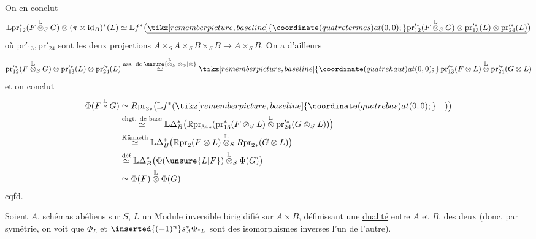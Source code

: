 On en conclut
\[
\mathbb{L} \mathrm{pr}_{12}^*(F\overset{\mathbb L}{\otimes}_S G)\otimes(\pi\times \mathrm{id}_B)^*(L)\simeq \mathbb{L} f^*\bigl(\underline{\tikz[remember picture,baseline]{\coordinate (quatretermes) at (0,0);}\mathrm{pr}_{12}^{\prime *}(F\overset{\mathbb L}{\otimes}_S G)\otimes \mathrm{pr}_{13}^{\prime *}(L)\otimes \mathrm{pr}_{24}^{\prime *}(L)}\bigr)
\]
où $\mathrm{pr}'_{13},\mathrm{pr}'_{24}$ sont les deux projections $A\times_S A\times_S B\times_S B\longrightarrow A\times_S B$. On a d'ailleurs
\[
\mathrm{pr}_{12}^{\prime *}(F\overset{\mathbb L}{\otimes}_S G)\otimes \mathrm{pr}_{13}^{\prime *}(L)\otimes \mathrm{pr}_{24}^{\prime *}(L)
\overset{\text{ass. de }\unsure{\overset{\mathbb L}{\otimes}_S|\otimes_S|\otimes}}{\simeq}
\tikz[remember picture,baseline]{\coordinate (quatrehaut) at (0,0);}\,\mathrm{pr}_{13}^{\prime *}(F\otimes L)\overset{\mathbb L}{\otimes} \mathrm{pr}_{24}^{\prime *}(G\otimes L)
\]
 et on conclut
\[
\begin{aligned}
\Phi(F\overset{\mathbb L}{*} G)&\simeq R \mathrm{pr}_{3*}\bigl(\mathbb{L} f^*(\tikz[remember picture,baseline]{\coordinate (quatrebas) at (0,0);}\hspace{1em})\bigr)\\
&\overset{\text{chgt. de base}}{\simeq}\mathbb{L}\Delta_B^*\bigl(\mathbb{R} \mathrm{pr}_{34*}(\mathrm{pr}_{13}^*(F\otimes_S L)\overset{\mathbb L}{\otimes} \mathrm{pr}_{24}^{\prime *}(G\otimes_S L))\bigr)\\
&\overset{\text{Künneth}}{\simeq}\mathbb{L}\Delta_B^*\bigl(\mathbb{R} \mathrm{pr}_2(F\otimes L)\overset{\mathbb L}{\otimes}_S R \mathrm{pr}_{2*}(G\otimes L)\bigr)\\
&\overset{\text{déf}}{\simeq}\mathbb{L}\Delta_B^*\bigl(\Phi(\unsure{L|F})\overset{\mathbb L}{\otimes}_S\Phi(G)\bigr)\\
&\simeq\Phi(F)\overset{\mathbb L}{\otimes}\Phi(G)
\end{aligned}
\]
cqfd.

  Soient $A$,   schémas abéliens sur $S$,  $L$ un Module inversible birigidifié sur $A\times B$, définissant une \uline{dualité} entre $A$ et $B$.   des deux
  (donc, par symétrie, on voit que $\Phi_L$ et $\inserted{(-1)^n}s_A^*\Phi_{{}^{s}L}$ sont des isomorphismes inverses l'un de l'autre).
